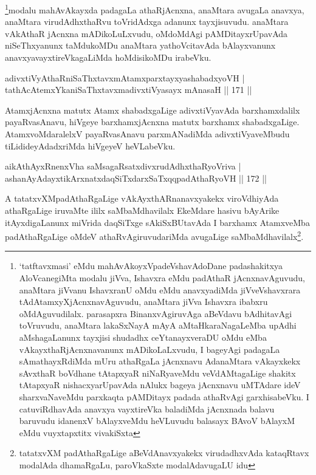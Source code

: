 \begin{artha}
\footnote[1]{`tatftavxmasi' eMdu mahAvAkoyxVpadeVshavAdoDane padashakitxya AloVcanegiMta modalu jiVva, Ishavxra eMdu padAthaR jAcnxnavAguvudu, anaMtara jiVvanu IshavxranU oMdu eMdu anavxyadiMda jiVveVshavxrara tAdAtamxyXjAcnxnavAguvudu, anaMtara jiVva Ishavxra ibabxru oMdAguvudilalx. parasapxra BinanxvAgiruvAga aBeVdavu bAdhitavAgi toVruvudu, anaMtara lakaSxNayA mAyA aMtaHkaraNagaLeMba upAdhi aMshagaLanunx tayxjisi shudadhx ceYtanayxveraDU oMdu eMba vAkayxthaRjAcnxnavanunx mADikoLaLxvudu, I bageyAgi padagaLa sAmathayxRdiMda mUru athaRgaLa jAcnxnavu AdanaMtara vAkayxkekx sAvxthaR boVdhane tAtapxyaR niNaRyaveMdu veVdAMtagaLige shakitx tAtapxyaR nishacxyarUpavAda nAlukx bageya jAcnxnavu uMTAdare ideV sharxvaNaveMdu parxkaqta pAMDitayx padada athaRvAgi garxhisabeVku. I catuviRdhavAda anavxya vayxtireVka baladiMda jAcnxnada balavu baruvudu idanenxV bAlayxveMdu heVLuvudu balasayx BAvoV bAlayxM eMdu vuyxtapxtitx vivakiSxta}modalu mahAvAkayxda padagaLa athaRjAcnxna, anaMtara avugaLa anavxya, anaMtara virudAdhxthaRvu toVridAdxga adanunx tayxjisuvudu. anaMtara vAkAthaR jAcnxna mADikoLuLxvudu, oMdoMdAgi pAMDitayxrUpavAda niSeThxyanunx taMdukoMDu anaMtara yathoVcitavAda bAlayxvanunx anavxyavayxtireVkagaLiMda hoMdisikoMDu irabeVku.
\end{artha}


\begin{shl}
adivxtiVyAthaRniSaThxtavxmAtamxparxtayxyashabadxyoVH |\\
tathAcA\s \s temxYkaniSaThxtavxmadivxtiVyasayx mAnasaH \hfill || 171 ||
\end{shl}

\begin{artha}
AtamxjAcnxna matutx Atamx shabadxgaLige adivxtiVyavAda barxhamxdalilx payaRvasAnavu, hiVgeye barxhamxjAcnxna matutx barxhamx shabadxgaLige. AtamxvoMdaralelxV payaRvasAnavu parxmANadiMda adivxtiVyaveMbudu tiLidideyAdadxriMda hiVgeyeV heVLabeVku.
\end{artha}

\begin{shl}
aikAthAyxRnenxVha saMsagaRsatxdivxrudAdhxthaRyoVriva |\\
ashanAyAdayxtikArxnatxdaqSiTxdarxSaTxqqpadAthaRyoVH \hfill || 172 ||
\end{shl}

\begin{artha}
A tatatxvXMpadAthaRgaLige vAkAyxthARnanavxyakekx viroVdhiyAda athaRgaLige iruvaMte ililx saMbaMdhavilalx EkeMdare hasivu bAyArike itAyxdigaLanunx miVrida daqSiTxge sAkiSxBUtavAda I barxhamx AtamxveMba padAthaRgaLige oMdeV athaRvAgiruvudariMda avugaLige saMbaMdhavilalx\footnote[1]{tatatxvXM padAthaRgaLige aBeVdAnavxyakekx virudadhxvAda kataqRtavx modalAda dhamaRgaLu, paroVkaSxte modalAdavugaLU idu}.
\end{artha}

